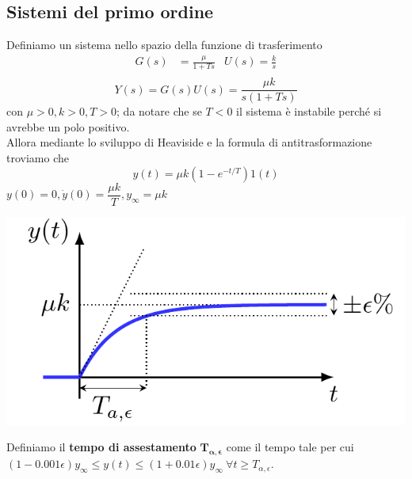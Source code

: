 \documentclass{article}
\numberwithin{equation}{subsection}
\let\oldsubsection\subsection%
\renewcommand{\subsection}{%
  \renewcommand{\theequation}{\thesubsection.\arabic{equation}}%
  \oldsubsection}%
\begin{document}
\subsection{Sistemi del primo ordine}
Definiamo un sistema nello spazio della funzione di trasferimento
\begin{align*}
    G(s) &= \frac{\mu}{1+T s} & U(s) = \frac{k}{s}\\
\end{align*}
\[
    Y(s) = G(s) U(s) = \frac{\mu k}{s(1+T s)}
\]
con $\mu >0,k>0,T>0$; da notare che se $T<0$ il sistema è instabile perché si avrebbe un polo positivo.
\vspace*{0.1cm}\\
Allora mediante lo sviluppo di Heaviside e la formula di antitrasformazione troviamo che
\[
    y(t) = \mu k(1-e^{-t/T})1(t)
\]
$y(0) = 0, \dot y(0) = \dfrac{\mu k}{T} , y_{\infty} = \mu k$
\begin{center}
    \includegraphics[scale=0.27]{Images/Sistemi_1_ordine_1.png}
\end{center}
Definiamo il \textbf{tempo di assestamento} $\mathbf{T_{\alpha,\epsilon}}$ come il tempo tale per cui $(1-0.001\epsilon)y_{\infty} \leq y(t) \leq (1+0.01\epsilon)y_{\infty} \ \forall t \geq T_{\alpha,\epsilon}$.
\end{document}
